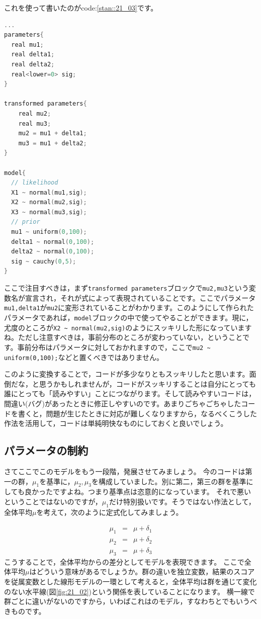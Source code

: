 \documentclass{ltjsbook}
\begin{document}
これを使って書いたのがcode:\ref{stan::21_03}です。
\begin{lstlisting}[language=C++,label={stan::21_03},caption={パラメータ変換を入れたコード}]
...
parameters{
  real mu1;
  real delta1;
  real delta2;
  real<lower=0> sig;
}

transformed parameters{
    real mu2;
    real mu3;
    mu2 = mu1 + delta1;
    mu3 = mu1 + delta2;
}

model{
  // likelihood
  X1 ~ normal(mu1,sig);
  X2 ~ normal(mu2,sig);
  X3 ~ normal(mu3,sig);
  // prior
  mu1 ~ uniform(0,100);
  delta1 ~ normal(0,100);
  delta2 ~ normal(0,100);
  sig ~ cauchy(0,5);
}

\end{lstlisting}
ここで注目すべきは，まず\verb|transformed parameters|ブロックで\verb|mu2,mu3|という変数名が宣言され，それが式によって表現されていることです。ここでパラメータ\verb|mu1,delta1|が\verb|mu2|に変形されていることがわかります。このようにして作られたパラメータであれば，\verb|model|ブロックの中で使ってやることができます。現に，尤度のところが\verb|X2 ~ normal(mu2,sig)|のようにスッキリした形になっていますね。ただし注意すべきは，事前分布のところが変わっていない，ということです。事前分布はパラメータに対しておかれますので，ここで\verb|mu2 ~ uniform(0,100);|などと置くべきではありません。

このように変換することで，コードが多少なりともスッキリしたと思います。面倒だな，と思うかもしれませんが，コードがスッキリすることは自分にとっても誰にとっても「読みやすい」ことにつながります。そして読みやすいコードは，間違い(バグ)があったときに修正しやすいのです。あまりごちゃごちゃしたコードを書くと，問題が生じたときに対応が難しくなりますから，なるべくこうした作法を活用して，コードは単純明快なものにしておくと良いでしょう。
\subsection{パラメータの制約}
さてここでこのモデルをもう一段階，発展させてみましょう。
今のコードは第一の群，$\mu_1$を基準に，$\mu_2,\mu_3$を構成していました。別に第二，第三の群を基準にしても良かったですよね。つまり基準点は恣意的になっています。
それで悪いということではないのですが，$\mu_1$だけ特別扱いです。そうではない作法として，全体平均$\mu$を考えて，次のように定式化してみましょう。

\begin{eqnarray}
	\mu_1 &=& \mu + \delta_1 \\
	\mu_2 &=& \mu + \delta_2 \\
	\mu_3 &=& \mu + \delta_3
\end{eqnarray}
こうすることで，全体平均からの差分としてモデルを表現できます。
ここで全体平均$\mu$はどういう意味があるでしょうか。群の違いを独立変数，結果のスコアを従属変数とした線形モデルの一環として考えると，全体平均は群を通じて変化のない水平線(図\ref{fig:21_02})という関係を表していることになります。
横一線で群ごとに違いがないのですから，いわばこれはのモデル，すなわちとでもいうべきものです。
\end{document}
